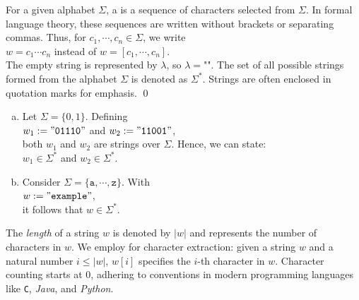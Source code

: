 \begin{Definition}[Strings]
For a given alphabet \( \Sigma \), a   is a sequence of characters selected from \( \Sigma \). In formal language theory, these sequences are written without brackets or separating commas. Thus, for \( c_1, \cdots, c_n \in \Sigma \), we write
\\[0.2cm]
\hspace*{1.3cm}
\( w = c_1 \cdots c_n \) \quad instead of \quad \( w = [c_1, \cdots, c_n] \).
\\[0.2cm]
The empty string is represented by \( \lambda \), \index{\( \lambda \)} so \( \lambda = \texttt{""} \).
The set of all possible strings formed from the alphabet \( \Sigma \) is denoted as \( \Sigma^* \). \index{\( \Sigma^* \)} Strings are often enclosed in quotation marks for emphasis.
\qed
\end{Definition}
\vspace*{\fill}

\pagebreak

\vspace*{\fill}

\pagebreak

\examplesEng
\begin{enumerate}[(a)]
\item Let \( \Sigma = \{0, 1\} \). Defining
      \\[0.2cm]
      \hspace*{1.3cm}
      \( w_1 := \mathtt{"01110"} \) and \( w_2 := \mathtt{"11001"} \),
      \\[0.2cm]
      both \( w_1 \) and \( w_2 \) are strings over \( \Sigma \). Hence, we can state:
      \\[0.2cm]
      \hspace*{1.3cm}
      \( w_1 \in \Sigma^* \) and \( w_2 \in \Sigma^* \).
\item Consider \( \Sigma = \{\mathtt{a}, \cdots, \mathtt{z}\} \). With
      \\[0.2cm]
      \hspace*{1.3cm}
      \( w := \mathtt{"example"} \),
      \\[0.2cm]
      it follows that \( w \in \Sigma^* \). \eox
\end{enumerate}

The \emph{length} of a string \( w \) is denoted by \( |w| \) and represents the number of characters in \( w
\).  
We employ  for character extraction: given a string \( w \) and a natural number
\( i \leq |w| \), \( w[i] \) specifies the \( i \)-th character in \( w \). Character counting starts at 0, adhering to
conventions in modern programming languages like \texttt{C}, \textsl{Java}, and \textsl{Python}. 

